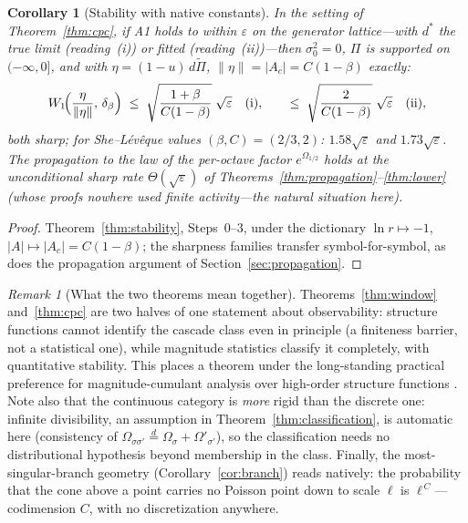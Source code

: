 \documentclass[12pt]{amsart}
\newtheorem{corollary}[theorem]{Corollary}
\theoremstyle{definition}
\theoremstyle{remark}
\newtheorem*{remark}{Remark}
\begin{document}
\begin{corollary}[Stability with native constants]\label{cor:mrmstab}
In the setting of Theorem~\textup{\ref{thm:cpc}}, if A1 holds to
within $\varepsilon$ on the generator lattice---with $d^*$ the true
limit (reading~(i)) or fitted (reading~(ii))---then $\sigma_0^2 =
0$, $\Pi$ is supported on $(-\infty,0]$, and with $\eta =
(1-u)\,d\tilde\Pi$, $\|\eta\| = |A_c| = C(1-\beta)$ exactly:
\[
  W_1\!\Bigl(\frac{\eta}{\|\eta\|},\,\delta_\beta\Bigr)
  \;\le\; \sqrt{\frac{1+\beta}{C(1-\beta)}}\;\sqrt{\varepsilon}
  \quad\textup{(i)},
  \qquad
  \le\; \sqrt{\frac{2}{C(1-\beta)}}\;\sqrt{\varepsilon}
  \quad\textup{(ii)},
\]
both sharp; for She--L\'ev\^eque values $(\beta, C) = (2/3, 2)$:
$1.58\sqrt\varepsilon$ and $1.73\sqrt\varepsilon$.  The propagation
to the law of the per-octave factor $e^{\Omega_{1/2}}$ holds at the
unconditional sharp rate $\Theta(\sqrt\varepsilon)$ of
Theorems~\ref{thm:propagation}--\ref{thm:lower} (whose proofs nowhere
used finite activity---the natural situation here).
\end{corollary}

\begin{proof}
Theorem~\ref{thm:stability}, Steps~0--3, under the dictionary
$\ln r \mapsto -1$, $|A| \mapsto |A_c| = C(1-\beta)$; the sharpness
families transfer symbol-for-symbol, as does the propagation
argument of Section~\ref{sec:propagation}.
\end{proof}

\begin{remark}[What the two theorems mean together]
Theorems~\ref{thm:window} and~\ref{thm:cpc} are two halves of one
statement about observability: structure functions cannot identify
the cascade class even in principle (a finiteness barrier, not a
statistical one), while magnitude statistics classify it completely,
with quantitative stability.  This places a theorem under the
long-standing practical preference for magnitude-cumulant analysis
over high-order structure functions \cite{DMA01}.  Note also that
the continuous category is \emph{more} rigid than the discrete one:
infinite divisibility, an assumption in
Theorem~\ref{thm:classification}, is automatic here (consistency of
$\Omega_{\sigma\sigma'} \stackrel{d}{=} \Omega_\sigma +
\Omega'_{\sigma'}$), so the classification needs no distributional
hypothesis beyond membership in the class.  Finally, the
most-singular-branch geometry (Corollary~\ref{cor:branch}) reads
natively: the probability that the cone above a point carries no
Poisson point down to scale $\ell$ is $\ell^{\,C}$---codimension
$C$, with no discretization anywhere.
\end{remark}
\end{document}
